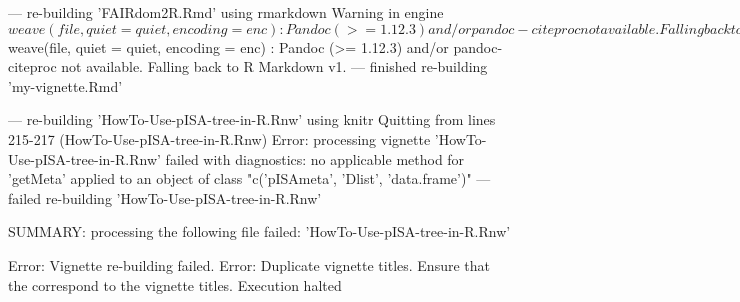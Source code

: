 \documentclass[a4paper,12pt]{article}\usepackage[]{graphicx}\usepackage[]{color}
\begin{document}
\begin{Schunk}
\begin{Soutput}
   --- re-building 'FAIRdom2R.Rmd' using rmarkdown
   Warning in engine$weave(file, quiet = quiet, encoding = enc) :
     Pandoc (>= 1.12.3) and/or pandoc-citeproc not available. Falling back to R Markdown v1.
   --- finished re-building 'FAIRdom2R.Rmd'
   
   --- re-building 'my-vignette.Rmd' using rmarkdown
   Warning in engine$weave(file, quiet = quiet, encoding = enc) :
     Pandoc (>= 1.12.3) and/or pandoc-citeproc not available. Falling back to R Markdown v1.
   --- finished re-building 'my-vignette.Rmd'
   
   --- re-building 'HowTo-Use-pISA-tree-in-R.Rnw' using knitr
   Quitting from lines 215-217 (HowTo-Use-pISA-tree-in-R.Rnw) 
   Error: processing vignette 'HowTo-Use-pISA-tree-in-R.Rnw' failed with diagnostics:
   no applicable method for 'getMeta' applied to an object of class "c('pISAmeta', 'Dlist', 'data.frame')"
   --- failed re-building 'HowTo-Use-pISA-tree-in-R.Rnw'
   
   SUMMARY: processing the following file failed:
     'HowTo-Use-pISA-tree-in-R.Rnw'
   
   Error: Vignette re-building failed.
   Error: Duplicate vignette titles.
     Ensure that the %\VignetteIndexEntry lines in the vignette sources
     correspond to the vignette titles.
   Execution halted



\end{Soutput}
\end{Schunk}
\end{document}
